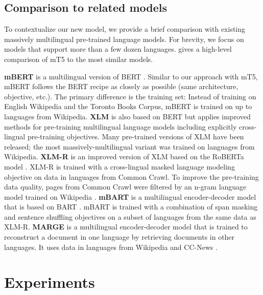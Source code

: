 \documentclass[11pt]{article}
\begin{document}
\begin{table*}[t!]
\label{tbl:detailed_results_full}
\end{table*} 
\subsection{Comparison to related models}

To contextualize our new model, we provide a brief comparison with existing massively multilingual pre-trained language models.
For brevity, we focus on models that support more than a few dozen languages.
 gives a high-level comparison of mT5 to the most similar models.

\textbf{mBERT} \citep{devlin2018multilingual} is a multilingual version of BERT \citep{devlin2018bert}.
Similar to our approach with mT5, mBERT follows the BERT recipe as closely as possible (same architecture, objective, etc.).
The primary difference is the training set: Instead of training on English Wikipedia and the Toronto Books Corpus, mBERT is trained on up to  languages from Wikipedia.
\textbf{XLM} \citep{conneau2019cross} is also based on BERT but applies improved methods for pre-training multilingual language models including explicitly cross-lingual pre-training objectives.
Many pre-trained versions of XLM have been released; the most massively-multilingual variant was trained on  languages from Wikipedia.
\textbf{XLM-R} \citep{conneau2019unsupervised} is an improved version of XLM based on the RoBERTa model \citep{liu2019roberta}.
\mbox{XLM-R} is trained with a cross-lingual masked language modeling objective on data in  languages from Common Crawl.
To improve the pre-training data quality, pages from Common Crawl were filtered by an n-gram language model trained on Wikipedia \citep{wenzek2019ccnet}.
\textbf{mBART} \citep{liu2020multilingual} is a multilingual encoder-decoder model that is based on BART \citep{lewis2019bart}.
mBART is trained with a combination of span masking and sentence shuffling objectives on a subset of  languages from the same data as XLM-R.
\textbf{MARGE} \citep{lewis2020pre} is a multilingual encoder-decoder model that is trained to reconstruct a document in one language by retrieving documents in other languages.
It uses data in  languages from Wikipedia and CC-News \citep{liu2019roberta}.

\section{Experiments}
\end{document}
